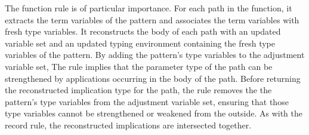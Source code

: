 \documentclass[acmsmall]{acmart}
\begin{document}
The function rule is of particular importance.
For each path in the function, it extracts the term variables of the pattern and associates 
the term variables with fresh type variables. It reconstructs the body of each path 
with an updated variable set and an updated typing environment containing the fresh
type variables of the pattern. By adding the pattern's type variables to the adjustment variable set,
The rule implies that the parameter type of the path can be strengthened by applications
occurring in the body of the path. 
Before returning the reconstructed implication type for the path, the rule removes
the the pattern's type variables from the adjustment variable set, ensuring
that those type variables cannot be strengthened or weakened from the outside. 
As with the record rule, the reconstructed implications are intersected together.

\end{document}
